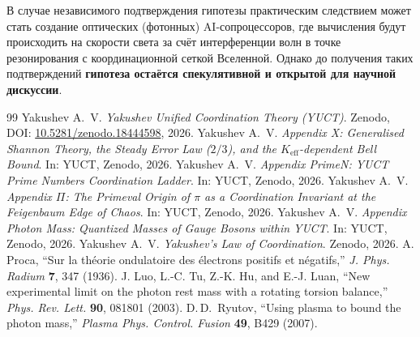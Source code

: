 \documentclass[11pt,a4paper]{article}
\begin{document}
	В случае независимого подтверждения гипотезы практическим следствием может стать создание оптических (фотонных) AI-сопроцессоров, где вычисления будут происходить на скорости света за счёт интерференции волн в точке резонирования с координационной сеткой Вселенной. Однако до получения таких подтверждений \textbf{гипотеза остаётся спекулятивной и открытой для научной дискуссии}.
	
	\begin{thebibliography}{99}
		Yakushev A.~V. \emph{Yakushev Unified Coordination Theory (YUCT)}. Zenodo, DOI: \href{https://doi.org/10.5281/zenodo.18444598}{10.5281/zenodo.18444598}, 2026.
		Yakushev A.~V. \emph{Appendix X: Generalised Shannon Theory, the Steady Error Law ($2/3$), and the $K_{\mathrm{eff}}$-dependent Bell Bound}. In: YUCT, Zenodo, 2026.
		Yakushev A.~V. \emph{Appendix PrimeN: YUCT Prime Numbers Coordination Ladder}. In: YUCT, Zenodo, 2026.
		Yakushev A.~V. \emph{Appendix $\Pi$: The Primeval Origin of $\pi$ as a Coordination Invariant at the Feigenbaum Edge of Chaos}. In: YUCT, Zenodo, 2026.
		Yakushev A.~V. \emph{Appendix Photon Mass: Quantized Masses of Gauge Bosons within YUCT}. In: YUCT, Zenodo, 2026.
		Yakushev A.~V. \emph{Yakushev's Law of Coordination}. Zenodo, 2026.
		A. Proca, ``Sur la théorie ondulatoire des électrons positifs et négatifs,'' \emph{J. Phys. Radium} \textbf{7}, 347 (1936).
		J. Luo, L.-C. Tu, Z.-K. Hu, and E.-J. Luan, ``New experimental limit on the photon rest mass with a rotating torsion balance,'' \emph{Phys. Rev. Lett.} \textbf{90}, 081801 (2003).
		D.\,D.\ Ryutov, ``Using plasma to bound the photon mass,'' \emph{Plasma Phys. Control. Fusion} \textbf{49}, B429 (2007).
	\end{thebibliography}
	
\end{document}
